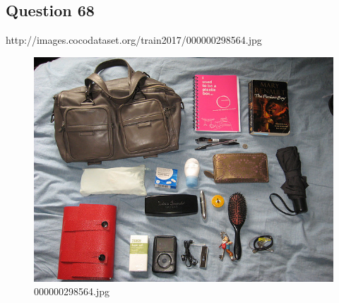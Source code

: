 \subsection*{Question 68}
http://images.cocodataset.org/train2017/000000298564.jpg
\begin{figure}[h]
    \centering
    \includegraphics[width=0.8\linewidth]{../image set/hard/000000298564.jpg}
    \caption{000000298564.jpg}
\end{figure}
